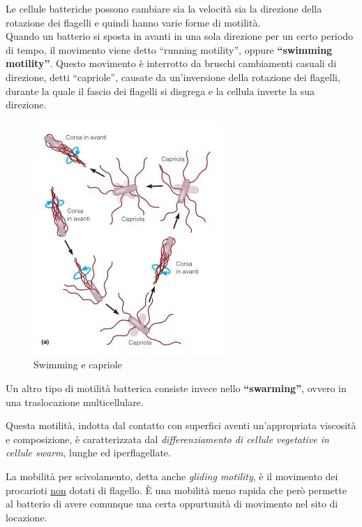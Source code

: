 \documentclass[11pt]{book}
\begin{document}
Le cellule batteriche possono cambiare sia la velocità sia la direzione della rotazione dei flagelli e quindi hanno varie forme di motilità.\\
Quando un batterio si sposta in avanti in una sola direzione per un certo periodo di tempo, il movimento viene detto ``running motility'', oppure \textbf{``swimming motility''}. Questo movimento è interrotto da bruschi cambiamenti casuali di direzione, detti ``capriole'', causate da un'inversione della rotazione dei flagelli, durante la quale il fascio dei flagelli si disgrega e la cellula inverte la sua direzione.

\begin{figure}[htp]
\centering
\includegraphics[scale=0.6]{img/Swimming e capriole.png}
\caption{Swimming e capriole}
\label{}
\end{figure}

Un altro tipo di motilità batterica  consiste invece nello \textbf{``swarming''}, ovvero in una traslocazione multicellulare.

Questa motilità, indotta dal contatto con superfici aventi un'appropriata viscosità e composizione, è caratterizzata dal \emph{differenziamento di cellule vegetative in cellule swarm}, lunghe ed iperflagellate.

La mobilità per scivolamento, detta anche \emph{gliding motility}, è il movimento dei procarioti \underline{non} dotati di flagello.
\`E una mobilità meno rapida che però permette al batterio di avere comunque una certa oppurtunità di movimento nel sito di locazione.
\end{document}
